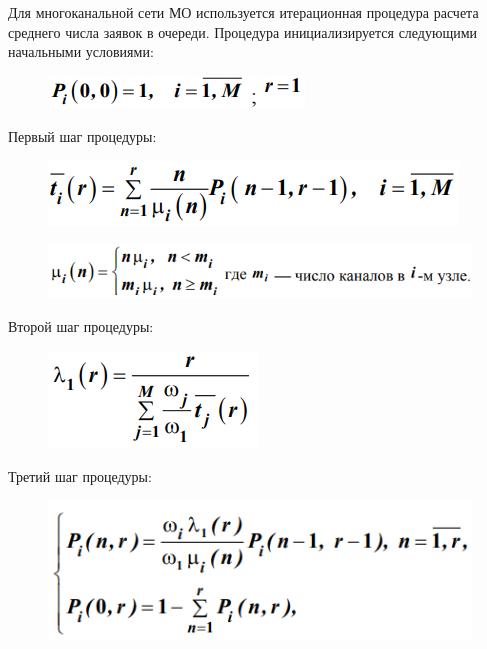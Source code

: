 \documentclass[14pt,a4paper,report]{report}
\begin{document}
Для многоканальной сети МО используется итерационная процедура расчета среднего числа заявок в очереди. Процедура инициализируется следующими начальными условиями:

\begin{figure}[h!]
	\centering
	\includegraphics[scale = 0.69]{images/4_0.png}
	\label{image:40}
\end{figure}

Первый шаг процедуры:

\begin{figure}[h!]
	\centering
	\includegraphics[scale = 0.69]{images/4_1.png}
	\label{image:41}
\end{figure}

\begin{figure}[h!]
	\centering
	\includegraphics[scale = 0.69]{images/4_m.png}
	\label{image:4m}
\end{figure}

Второй шаг процедуры:

\begin{figure}[h!]
	\centering
	\includegraphics[scale = 0.69]{images/4_2.png}
	\label{image:42}
\end{figure}

Третий шаг процедуры:

\begin{figure}[h!]
	\centering
	\includegraphics[scale = 0.69]{images/4_3.png}
	\label{image:43}
\end{figure}
\end{document}
